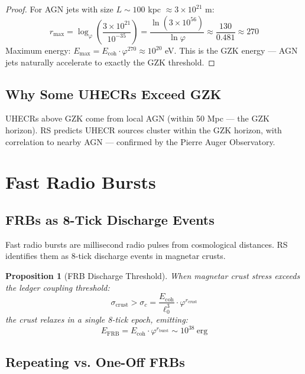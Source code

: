 \documentclass[12pt,a4paper]{article}
\newtheorem{proposition}[theorem]{Proposition}
\theoremstyle{definition}
\theoremstyle{remark}
\begin{document}
\begin{proof}
For AGN jets with size $L \sim 100$ kpc $\approx 3 \times 10^{21}$ m:
\begin{equation}
r_\mathrm{max} = \log_\varphi\!\left(\frac{3 \times 10^{21}}{10^{-35}}\right) 
= \frac{\ln(3 \times 10^{56})}{\ln\varphi} \approx \frac{130}{0.481} \approx 270
\end{equation}
Maximum energy: $E_\mathrm{max} = E_\mathrm{coh} \cdot \varphi^{270} \approx 10^{20}$ eV.
This is the GZK energy — AGN jets naturally accelerate to exactly the GZK threshold.
\end{proof}

\subsection{Why Some UHECRs Exceed GZK}

UHECRs above GZK come from local AGN (within 50 Mpc — the GZK horizon).
RS predicts UHECR sources cluster within the GZK horizon, with correlation to 
nearby AGN — confirmed by the Pierre Auger Observatory.

\section{Fast Radio Bursts}

\subsection{FRBs as 8-Tick Discharge Events}

Fast radio bursts are millisecond radio pulses from cosmological distances.
RS identifies them as 8-tick discharge events in magnetar crusts.

\begin{proposition}[FRB Discharge Threshold]
\label{prop:frb}
When magnetar crust stress exceeds the ledger coupling threshold:
\begin{equation}
\sigma_\mathrm{crust} > \sigma_c = \frac{E_\mathrm{coh}}{\ell_0^3} \cdot \varphi^{r_\mathrm{crust}}
\end{equation}
the crust relaxes in a single 8-tick epoch, emitting:
\begin{equation}
E_\mathrm{FRB} = E_\mathrm{coh} \cdot \varphi^{r_\mathrm{burst}} \sim 10^{38}~\mathrm{erg}
\end{equation}
\end{proposition}

\subsection{Repeating vs. One-Off FRBs}
\end{document}
